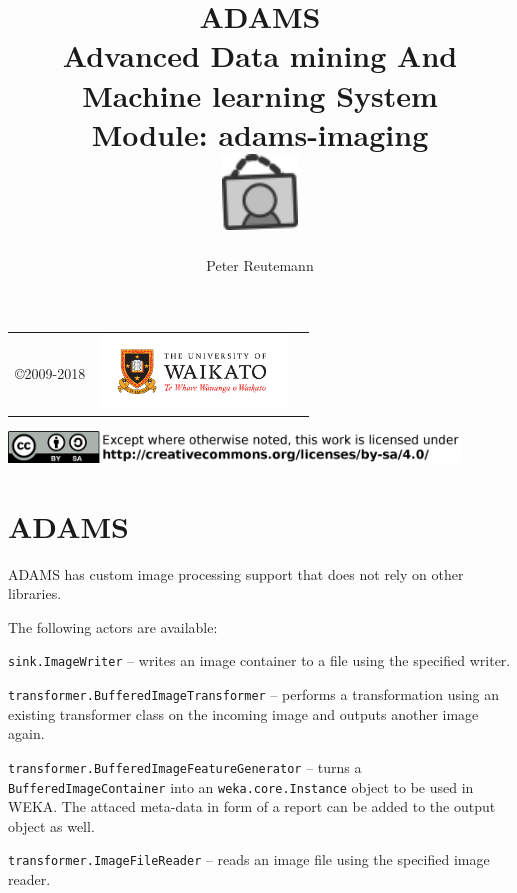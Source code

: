 \documentclass[a4paper]{book}
\title{
  \textbf{ADAMS} \\
  {\Large \textbf{A}dvanced \textbf{D}ata mining \textbf{A}nd \textbf{M}achine
  learning \textbf{S}ystem} \\
  {\Large Module: adams-imaging} \\
  \vspace{1cm}
  \includegraphics[width=2cm]{images/imaging-module.png} \\
}
\author{
  Peter Reutemann
}
\begin{document}
\begin{titlepage}
\maketitle

\thispagestyle{empty}
\center
\begin{table}[b]
	\begin{tabular}{c l l}
		\parbox[c][2cm]{2cm}{\copyright 2009-2018} &
		\parbox[c][2cm]{5cm}{\includegraphics[width=5cm]{images/coat_of_arms.pdf}} \\
	\end{tabular}
	\includegraphics[width=12cm]{images/cc.png} \\
\end{table}

\end{titlepage}

\tableofcontents
\listoffigures


\chapter{ADAMS}
ADAMS has custom image processing support that does not rely on other libraries.

The following actors are available:
\begin{tight_itemize}
	\item \texttt{sink.ImageWriter} -- writes an image container to a file
	using the specified writer.
	\item \texttt{transformer.BufferedImageTransformer} -- performs a transformation
	using an existing transformer class on the incoming image and
	outputs another image again.
	\item \texttt{transformer.BufferedImageFeatureGenerator} -- turns a
	\texttt{BufferedImageContainer} into an \texttt{weka.core.Instance} object to
	be used in WEKA. The attaced meta-data in form of a report can be added to the
	output object as well.
	\item \texttt{transformer.ImageFileReader} -- reads an image file using the
	specified image reader.
\end{tight_itemize}
\end{document}
